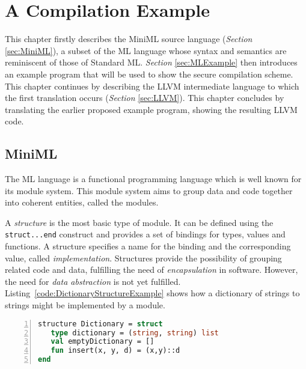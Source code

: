 \documentclass[10pt,a4paper]{report}
\begin{document}
\newcommand{\lsttext}[1]{\lstinline$#1$}

\chapter{A Compilation Example}

This chapter firstly describes the \mbox{MiniML} source language (\emph{Section} \ref{sec:MiniML}), a subset of the ML language whose syntax and semantics are reminiscent of those of Standard ML. \emph{Section} \ref{sec:MLExample} then introduces an example program that will be used to show the secure compilation scheme. This chapter continues by describing the LLVM intermediate language to which the first translation occurs (\emph{Section} \ref{sec:LLVM}). This chapter concludes by translating the earlier proposed example program, showing the resulting LLVM code.

\section{MiniML\label{sec:MiniML}}
The ML language is a functional programming language which is well known for its module system. This module system aims to group data and code together into coherent entities, called the modules.

A \emph{structure} is the most basic type of module. It can be defined using the \texttt{struct...end} construct and provides a set of bindings for types, values and functions. A structure specifies a name for the binding and the corresponding value, called \emph{implementation}. Structures provide the possibility of grouping related code and data, fulfilling the need of \emph{encapsulation} in software. However, the need for \emph{data abstraction} is not yet fulfilled. Listing~\ref{code:DictionaryStructureExample} shows how a dictionary of strings to strings might be implemented by a module.
~
\begin{lstlisting}[frame=single, language=ML,caption=An example structure showing the definition of a dictionary in ML, label=code:DictionaryStructureExample,numbers=left]
structure Dictionary = struct
   type dictionary = (string, string) list
   val emptyDictionary = []
   fun insert(x, y, d) = (x,y)::d
end
\end{lstlisting}
\end{document}
